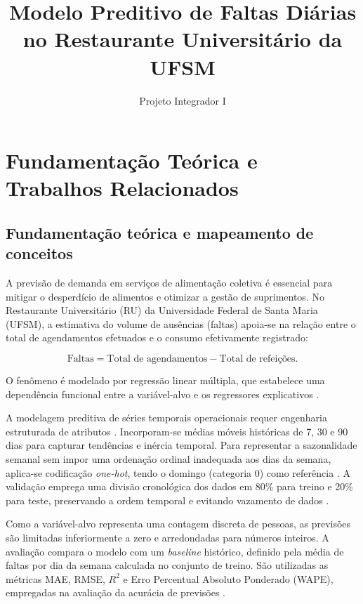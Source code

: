 \documentclass[11pt,a4paper]{article}
\title{Modelo Preditivo de Faltas Diárias no Restaurante Universitário da UFSM}
\author{Projeto Integrador I}
\date{}
\begin{document}
\maketitle

\section{Fundamentação Teórica e Trabalhos Relacionados}

\subsection{Fundamentação teórica e mapeamento de conceitos}

A previsão de demanda em serviços de alimentação coletiva é essencial para mitigar o desperdício de alimentos e otimizar a gestão de suprimentos. No Restaurante Universitário (RU) da Universidade Federal de Santa Maria (UFSM), a estimativa do volume de ausências (faltas) apoia-se na relação entre o total de agendamentos efetuados e o consumo efetivamente registrado:

\begin{equation}
    \text{Faltas} = \text{Total de agendamentos} - \text{Total de refeições}.
\end{equation}

O fenômeno é modelado por regressão linear múltipla, que estabelece uma dependência funcional entre a variável-alvo e os regressores explicativos \cite{gareth2023introduction}.

A modelagem preditiva de séries temporais operacionais requer engenharia estruturada de atributos \cite{kuhn2019feature}. Incorporam-se médias móveis históricas de 7, 30 e 90 dias para capturar tendências e inércia temporal. Para representar a sazonalidade semanal sem impor uma ordenação ordinal inadequada aos dias da semana, aplica-se codificação \textit{one-hot}, tendo o domingo (categoria 0) como referência \cite{kuhn2019feature}. A validação emprega uma divisão cronológica dos dados em 80\% para treino e 20\% para teste, preservando a ordem temporal e evitando vazamento de dados \cite{hyndman2012principles}.

Como a variável-alvo representa uma contagem discreta de pessoas, as previsões são limitadas inferiormente a zero e arredondadas para números inteiros. A avaliação compara o modelo com um \textit{baseline} histórico, definido pela média de faltas por dia da semana calculada no conjunto de treino. São utilizadas as métricas MAE, RMSE, $R^2$ e Erro Percentual Absoluto Ponderado (WAPE), empregadas na avaliação da acurácia de previsões \cite{hyndman2006another}.
\end{document}
